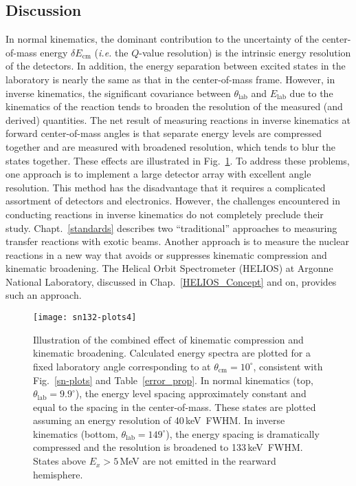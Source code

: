 \subsection{Discussion}
In normal kinematics, the dominant contribution to the uncertainty of the center-of-mass energy $\delta E_\mathrm{cm}$ (\textit{i.e.} the $Q$-value resolution) is the intrinsic energy resolution of the detectors.  In addition, the energy separation between excited states in the laboratory is nearly the same as that in the center-of-mass frame.  However, in inverse kinematics, the significant covariance between $\theta_\mathrm{lab}$ and $E_\mathrm{lab}$ due to the kinematics of the reaction tends to broaden the resolution of the measured (and derived) quantities.  The net result of measuring reactions in inverse kinematics at forward center-of-mass angles is that separate energy levels are compressed together and are measured with broadened resolution, which tends to blur the states together.  These effects are illustrated in Fig.~\ref{kin_broad_fig}.  To address these problems, one approach is to implement a large detector array with excellent angle resolution.  This method has the disadvantage that it requires a complicated assortment of detectors and electronics.  However, the challenges encountered in conducting reactions in inverse kinematics do not completely preclude their study.  Chapt.~\ref{standards} describes two ``traditional'' approaches to measuring transfer reactions with exotic beams.     Another approach is to measure the nuclear reactions in a new way that avoids or suppresses kinematic compression and kinematic broadening.  The Helical Orbit Spectrometer (HELIOS) at Argonne National Laboratory, discussed in Chap.~\ref{HELIOS_Concept} and on, provides such an approach.

\begin{figure}%
\centering
\texttt{[image: sn132-plots4]}
\caption[Illustration of the combined effect of kinematic compression and kinematic broadening]{Illustration of the combined effect of kinematic compression and kinematic broadening.  Calculated energy spectra are plotted for a fixed laboratory angle corresponding to at $\theta_\mathrm{cm}=10^\circ$, consistent with Fig.~\ref{sn-plots} and Table~\ref{error_prop}.  In normal kinematics (top, $\theta_\mathrm{lab}=9.9^\circ$), the energy level spacing approximately constant and equal to the spacing in the center-of-mass.  These states are plotted assuming an energy resolution of 40\,keV~FWHM.  In inverse kinematics (bottom, $\theta_\mathrm{lab}=149^\circ$), the energy spacing is dramatically compressed and the resolution is broadened to 133\,keV~FWHM.  States above $E_x > 5$\,MeV are not emitted in the rearward hemisphere.}%
\label{kin_broad_fig}%
\end{figure}

